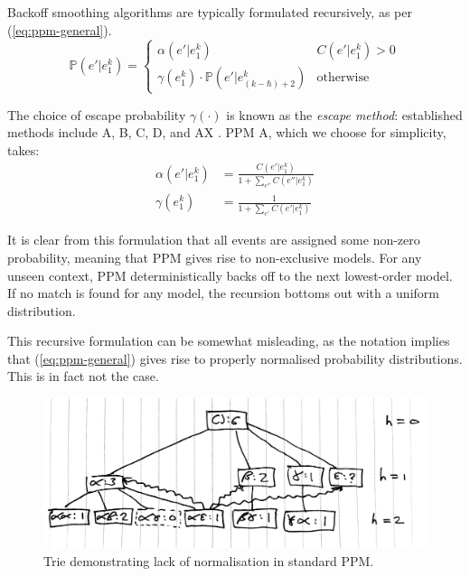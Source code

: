 \documentclass[12pt,a4paper,twoside,openright]{report}
\begin{document}
Backoff smoothing algorithms are typically formulated recursively, as per
(\ref{eq:ppm-general}).
\begin{equation}\label{eq:ppm-general}
  \mathbb{P}(e' | e_1^k) = \begin{cases}
  \alpha(e'|e_1^k) & C(e' | e_1^k) > 0 \\
\gamma(e_1^k) \cdot \mathbb{P}(e' | e_{(k - \hbar) + 2}^k) & \text{otherwise}
\end{cases} 
\end{equation} 

The choice of escape probability $\gamma(\cdot)$ is known as the \emph{escape
method}: established methods include A, B, C, D, and AX
\cite{pearce2004improved}. PPM A, which we choose for simplicity, takes:
\begin{align}
  \label{eq:ppm-a-alpha}
  \alpha(e' | e_1^k) &= \frac{ C(e' | e_1^k) }{ 1 + \sum_{e''} C(e'' | e_1^k) }
  \\
  \gamma(e_1^k) &= \frac{ 1 }{ 1 + \sum_{e'} C(e' | e_1^k) }
  \label{eq:ppm-a-gamma}
\end{align}

It is clear from this formulation that all events are assigned some non-zero
probability, meaning that PPM gives rise to non-exclusive models. For any unseen
context, PPM deterministically backs off to the next lowest-order model. If no
match is found for any model, the recursion bottoms out with a uniform
distribution. 

This recursive formulation can be somewhat misleading, as the notation implies
that (\ref{eq:ppm-general}) gives rise to properly normalised probability
distributions. This is in fact not the case. 

\begin{figure}[H]
\centering
\includegraphics[width=400pt]{figs/problematic_trie_tmp.jpg}
\caption{Trie demonstrating lack of normalisation in standard PPM.}
\label{fig:bad-ppm-trie}
\end{figure}
\end{document}
